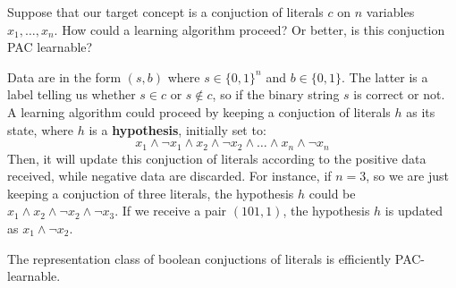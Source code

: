 Suppose that our target concept is a conjuction of literals $c$ on $n$ variables $x_1, \dots, x_n$. How could a learning algorithm proceed? Or better, is this 
conjuction PAC learnable? \vspace{7pt}

Data are in the form $(s,b)$ where $s \in \{0,1\}^n$ and $b \in \{0,1\}$. The latter is a label telling us whether $s \in c$ or $s \notin c$, so if the binary 
string $s$ is correct or not. A learning algorithm could proceed by keeping a conjuction of literals $h$ as its state, where $h$ is a \textbf{hypothesis}, initially
set to:
$$x_1 \wedge \neg x_1 \wedge x_2 \wedge \neg x_2 \wedge \dots \wedge x_n \wedge \neg x_n$$
Then, it will update this conjuction of literals according to the positive data received, while negative data are discarded. For instance, if $n = 3$, so we are
just keeping a conjuction of three literals, the hypothesis $h$ could be $x_1 \wedge x_2 \wedge \neg x_2 \wedge \neg x_3$. If we receive a pair $(101, 1)$, the 
hypothesis $h$ is updated as $x_1 \wedge \neg x_2$. \vspace{7pt}

\begin{definition}[title = Theorem]
    The representation class of boolean conjuctions of literals is efficiently PAC-learnable.
\end{definition}